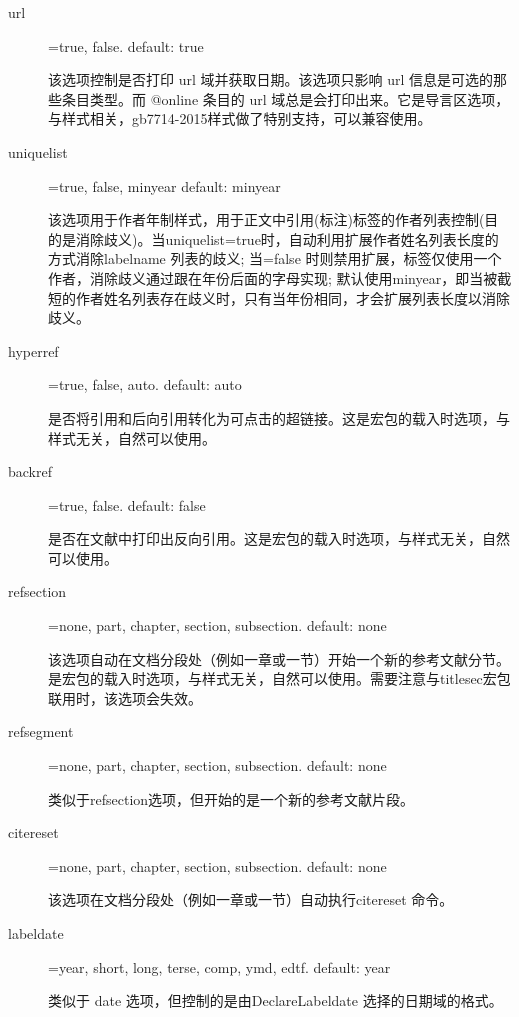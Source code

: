 \begin{description}
  \item[url]=true, false. \hfill default: true

  该选项控制是否打印 url 域并获取日期。该选项只影响 url 信息是可选的那些条目类型。而 @online 条目的 url 域总是会打印出来。它是导言区选项，与样式相关，gb7714-2015样式做了特别支持，可以兼容使用。

  \item[uniquelist]=true, false, minyear \hfill default: minyear

  该选项用于作者年制样式，用于正文中引用(标注)标签的作者列表控制(目的是消除歧义)。当uniquelist=true时，自动利用扩展作者姓名列表长度的方式消除labelname 列表的歧义; 当=false 时则禁用扩展，标签仅使用一个作者，消除歧义通过跟在年份后面的字母实现; 默认使用minyear，即当被截短的作者姓名列表存在歧义时，只有当年份相同，才会扩展列表长度以消除歧义。

  \item[hyperref]=true, false, auto. \hfill default: auto

  是否将引用和后向引用转化为可点击的超链接。这是宏包的载入时选项，与样式无关，自然可以使用。

  \item[backref]=true, false. \hfill default: false

  是否在文献中打印出反向引用。这是宏包的载入时选项，与样式无关，自然可以使用。

  \item[refsection]=none, part, chapter, section, subsection. \hfill default: none

  该选项自动在文档分段处（例如一章或一节）开始一个新的参考文献分节。是宏包的载入时选项，与样式无关，自然可以使用。需要注意与titlesec宏包联用时，该选项会失效。

  \item[refsegment]=none, part, chapter, section, subsection. \hfill default: none

  类似于refsection选项，但开始的是一个新的参考文献片段。

  \item[citereset]=none, part, chapter, section, subsection. \hfill default: none

  该选项在文档分段处（例如一章或一节）自动执行citereset 命令。

  \item[labeldate]=year, short, long, terse, comp, ymd, edtf. \hfill default: year

  类似于 date 选项，但控制的是由DeclareLabeldate 选择的日期域的格式。


\end{description}
